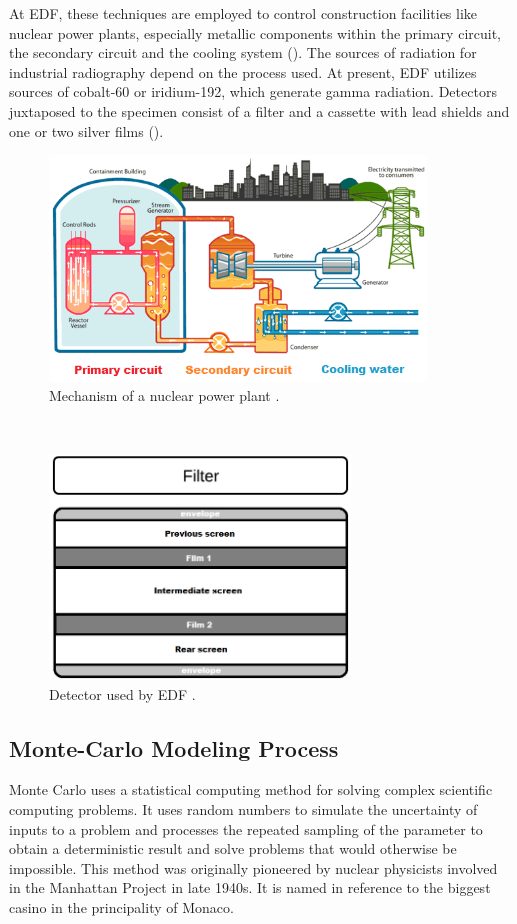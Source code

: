 At EDF, these techniques are employed to control construction facilities like nuclear power plants, especially metallic components within the primary circuit, the secondary circuit and the cooling system (). The sources of radiation for industrial radiography depend on the process used. At present, EDF utilizes sources of cobalt-60 or iridium-192, which generate gamma radiation. Detectors juxtaposed to the specimen consist of a filter and a cassette with lead shields and one or two silver films ().
\\[1cm]
\begin{figure}[htbp]
	\centering
		\includegraphics[width=10cm]{Figures/2.png}
	\caption[Mechanism of a nuclear power plant]{Mechanism of a nuclear power plant \citep{plant}.}%
	\label{fig:2}
\end{figure}
\\[1cm]
\begin{figure}[htbp]
	\centering
		\includegraphics[width=8cm]{Figures/3.png}
	\caption[Detector used by EDF]{Detector used by EDF \citep{Reference10}.}%
	\label{fig:3}
\end{figure}

\subsection{Monte-Carlo Modeling Process}
Monte Carlo uses a statistical computing method for solving complex scientific computing problems. It uses random numbers to simulate the uncertainty of inputs to a problem and processes the repeated sampling of the parameter to obtain a deterministic result and solve problems that would otherwise be impossible. This method was originally pioneered by nuclear physicists involved in the Manhattan Project in late 1940s. It is named in reference to the biggest casino in the principality of Monaco.


